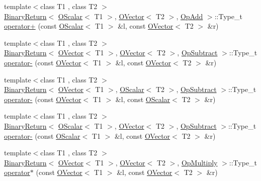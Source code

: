 \begin{DoxyCompactItemize}
\item 
{\footnotesize template$<$class T1 , class T2 $>$ }\\\mbox{\hyperlink{structENSEM_1_1BinaryReturn}{Binary\+Return}}$<$ \mbox{\hyperlink{classENSEM_1_1OScalar}{O\+Scalar}}$<$ T1 $>$, \mbox{\hyperlink{classENSEM_1_1OVector}{O\+Vector}}$<$ T2 $>$, \mbox{\hyperlink{structENSEM_1_1OpAdd}{Op\+Add}} $>$\+::Type\+\_\+t \mbox{\hyperlink{group__obsvector_ga19b9d8af56a96f2d3b3455fe4ec1f98f}{operator+}} (const \mbox{\hyperlink{classENSEM_1_1OScalar}{O\+Scalar}}$<$ T1 $>$ \&l, const \mbox{\hyperlink{classENSEM_1_1OVector}{O\+Vector}}$<$ T2 $>$ \&r)
\item 
{\footnotesize template$<$class T1 , class T2 $>$ }\\\mbox{\hyperlink{structENSEM_1_1BinaryReturn}{Binary\+Return}}$<$ \mbox{\hyperlink{classENSEM_1_1OVector}{O\+Vector}}$<$ T1 $>$, \mbox{\hyperlink{classENSEM_1_1OVector}{O\+Vector}}$<$ T2 $>$, \mbox{\hyperlink{structENSEM_1_1OpSubtract}{Op\+Subtract}} $>$\+::Type\+\_\+t \mbox{\hyperlink{group__obsvector_ga928e3f4f9c8ac492925b3d1a78d11216}{operator-\/}} (const \mbox{\hyperlink{classENSEM_1_1OVector}{O\+Vector}}$<$ T1 $>$ \&l, const \mbox{\hyperlink{classENSEM_1_1OVector}{O\+Vector}}$<$ T2 $>$ \&r)
\item 
{\footnotesize template$<$class T1 , class T2 $>$ }\\\mbox{\hyperlink{structENSEM_1_1BinaryReturn}{Binary\+Return}}$<$ \mbox{\hyperlink{classENSEM_1_1OVector}{O\+Vector}}$<$ T1 $>$, \mbox{\hyperlink{classENSEM_1_1OScalar}{O\+Scalar}}$<$ T2 $>$, \mbox{\hyperlink{structENSEM_1_1OpSubtract}{Op\+Subtract}} $>$\+::Type\+\_\+t \mbox{\hyperlink{group__obsvector_ga99ab390926e54bd5fb8ad9265047f9cb}{operator-\/}} (const \mbox{\hyperlink{classENSEM_1_1OVector}{O\+Vector}}$<$ T1 $>$ \&l, const \mbox{\hyperlink{classENSEM_1_1OScalar}{O\+Scalar}}$<$ T2 $>$ \&r)
\item 
{\footnotesize template$<$class T1 , class T2 $>$ }\\\mbox{\hyperlink{structENSEM_1_1BinaryReturn}{Binary\+Return}}$<$ \mbox{\hyperlink{classENSEM_1_1OScalar}{O\+Scalar}}$<$ T1 $>$, \mbox{\hyperlink{classENSEM_1_1OVector}{O\+Vector}}$<$ T2 $>$, \mbox{\hyperlink{structENSEM_1_1OpSubtract}{Op\+Subtract}} $>$\+::Type\+\_\+t \mbox{\hyperlink{group__obsvector_gaa851105d0e0292f6a8503c61aafb6bb8}{operator-\/}} (const \mbox{\hyperlink{classENSEM_1_1OScalar}{O\+Scalar}}$<$ T1 $>$ \&l, const \mbox{\hyperlink{classENSEM_1_1OVector}{O\+Vector}}$<$ T2 $>$ \&r)
\item 
{\footnotesize template$<$class T1 , class T2 $>$ }\\\mbox{\hyperlink{structENSEM_1_1BinaryReturn}{Binary\+Return}}$<$ \mbox{\hyperlink{classENSEM_1_1OVector}{O\+Vector}}$<$ T1 $>$, \mbox{\hyperlink{classENSEM_1_1OVector}{O\+Vector}}$<$ T2 $>$, \mbox{\hyperlink{structENSEM_1_1OpMultiply}{Op\+Multiply}} $>$\+::Type\+\_\+t \mbox{\hyperlink{group__obsvector_gaa0cd2e75ed42d1c8d749cbc22ea5d244}{operator$\ast$}} (const \mbox{\hyperlink{classENSEM_1_1OVector}{O\+Vector}}$<$ T1 $>$ \&l, const \mbox{\hyperlink{classENSEM_1_1OVector}{O\+Vector}}$<$ T2 $>$ \&r)

\end{DoxyCompactItemize}
